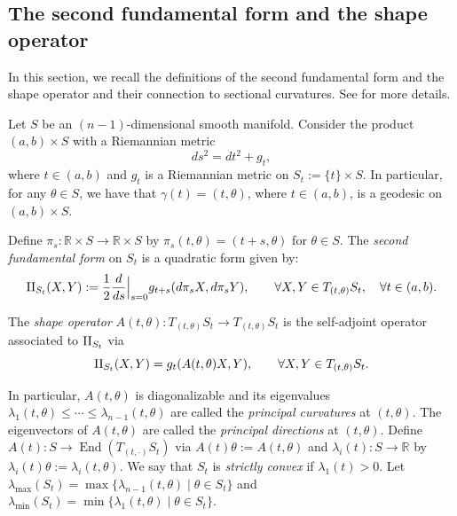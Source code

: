 \documentclass[10pt]{amsart}
\let\sep\mid
\DeclareMathOperator{\End}{End}
\theoremstyle{definition}
\newcommand{\RomanNumeralCaps}[1]
{\MakeUppercase{\romannumeral #1}}
\newcommand{\II}{\textup{\RomanNumeralCaps{2}}}
\renewcommand{\>}{{\rangle}}
\newcommand{\<}{{\langle}}
\begin{document}
\subsection{The second fundamental form and the shape operator}\label{section: SFF}

In this section, we recall the definitions of the second fundamental form and the shape operator and their connection to sectional curvatures. See \cite{G94} for more details.

Let $S$ be an $(n-1)$-dimensional smooth manifold. Consider the product $(a,b)\times S$ with a Riemannian metric
\begin{equation*}
ds^2=dt^2+g_t,
\end{equation*}
where $t\in(a,b)$ and $g_t$ is a Riemannian metric on $S_t:=\{t\}\times S$. In particular, for any $\theta\in S$, we have that $\gamma(t)=(t,\theta)$, where $t\in(a,b)$, is a geodesic on $(a,b)\times S$.

Define $\pi_s: \mathbb R\times S\to \mathbb R\times S$ by $\pi_s(t,\theta)=(t+s,\theta)$ for $\theta\in S$. The \textit{second fundamental form} on $S_t$ is a quadratic form given by:
\begin{equation}\label{def: second_fundamental_form}
\II_{S_t}(X, Y):=\frac{1}{2}\frac{d}{ds}\Big|_{s=0}g_{t+s}(d\pi_sX,d\pi_sY), \qquad\forall X, Y\in T_{(t,\theta)}S_t, \quad \forall t\in(a,b).
\end{equation}

The \textit{shape operator} $A(t, \theta): T_{(t,\theta)}S_t\to T_{(t,\theta)}S_t$ is the self-adjoint operator associated to $\II_{S_t}$ via
\begin{equation*}
\II_{S_t}(X, Y)=g_t(A(t, \theta)X, Y), \qquad\forall X, Y\in T_{(t,\theta)}S_t.
\end{equation*}

In particular, $A(t,\theta)$ is diagonalizable and its eigenvalues $\lambda_1(t,\theta)\leq \cdots\leq \lambda_{n-1}(t,\theta)$ are called the {\it principal curvatures} at $(t,\theta)$. The eigenvectors of $A(t,\theta)$ are called the {\it principal directions} at $(t,\theta)$. Define $A(t)\colon S\to \End(T_{(t,\cdot)}S_t)$ via $A(t)\theta:=A(t,\theta)$ and $\lambda_i(t)\colon S\to\mathbb{R}$ by $\lambda_i(t)\theta:=\lambda_i(t,\theta)$. We say that $S_t$ is \textit{strictly convex} if $\lambda_1(t)>0$. Let $\lambda_{\max}(S_t) = \max\{\lambda_{n-1}(t,\theta)\sep \theta\in S_t\}$ and $\lambda_{\min}(S_t) = \min\{\lambda_1(t,\theta)\sep\theta\in S_t\}$.
\end{document}

